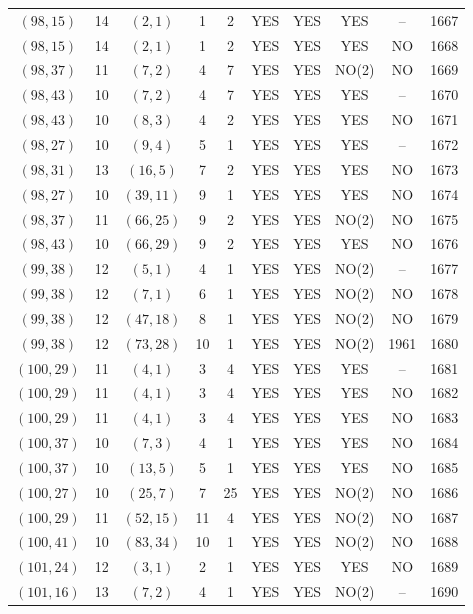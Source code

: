 \begin{longtable}{|c|c|c|c|c|c|c|c|c|c|}
$(98, 15)$ & 14 & $(2, 1)$ & 1 & 2 & YES & YES & YES & -- & 1667\\
$(98, 15)$ & 14 & $(2, 1)$ & 1 & 2 & YES & YES & YES & NO & 1668\\
$(98, 37)$ & 11 & $(7, 2)$ & 4 & 7 & YES & YES & NO(2) & NO & 1669\\
$(98, 43)$ & 10 & $(7, 2)$ & 4 & 7 & YES & YES & YES & -- & 1670\\
$(98, 43)$ & 10 & $(8, 3)$ & 4 & 2 & YES & YES & YES & NO & 1671\\
$(98, 27)$ & 10 & $(9, 4)$ & 5 & 1 & YES & YES & YES & -- & 1672\\
$(98, 31)$ & 13 & $(16, 5)$ & 7 & 2 & YES & YES & YES & NO & 1673\\
$(98, 27)$ & 10 & $(39, 11)$ & 9 & 1 & YES & YES & YES & NO & 1674\\
$(98, 37)$ & 11 & $(66, 25)$ & 9 & 2 & YES & YES & NO(2) & NO & 1675\\
$(98, 43)$ & 10 & $(66, 29)$ & 9 & 2 & YES & YES & YES & NO & 1676\\
$(99, 38)$ & 12 & $(5, 1)$ & 4 & 1 & YES & YES & NO(2) & -- & 1677\\
$(99, 38)$ & 12 & $(7, 1)$ & 6 & 1 & YES & YES & NO(2) & NO & 1678\\
$(99, 38)$ & 12 & $(47, 18)$ & 8 & 1 & YES & YES & NO(2) & NO & 1679\\
$(99, 38)$ & 12 & $(73, 28)$ & 10 & 1 & YES & YES & NO(2) & 1961 & 1680\\
$(100, 29)$ & 11 & $(4, 1)$ & 3 & 4 & YES & YES & YES & -- & 1681\\
$(100, 29)$ & 11 & $(4, 1)$ & 3 & 4 & YES & YES & YES & NO & 1682\\
$(100, 29)$ & 11 & $(4, 1)$ & 3 & 4 & YES & YES & YES & NO & 1683\\
$(100, 37)$ & 10 & $(7, 3)$ & 4 & 1 & YES & YES & YES & NO & 1684\\
$(100, 37)$ & 10 & $(13, 5)$ & 5 & 1 & YES & YES & YES & NO & 1685\\
$(100, 27)$ & 10 & $(25, 7)$ & 7 & 25 & YES & YES & NO(2) & NO & 1686\\
$(100, 29)$ & 11 & $(52, 15)$ & 11 & 4 & YES & YES & NO(2) & NO & 1687\\
$(100, 41)$ & 10 & $(83, 34)$ & 10 & 1 & YES & YES & NO(2) & NO & 1688\\
$(101, 24)$ & 12 & $(3, 1)$ & 2 & 1 & YES & YES & YES & NO & 1689\\
$(101, 16)$ & 13 & $(7, 2)$ & 4 & 1 & YES & YES & NO(2) & -- & 1690\\

\end{longtable}
